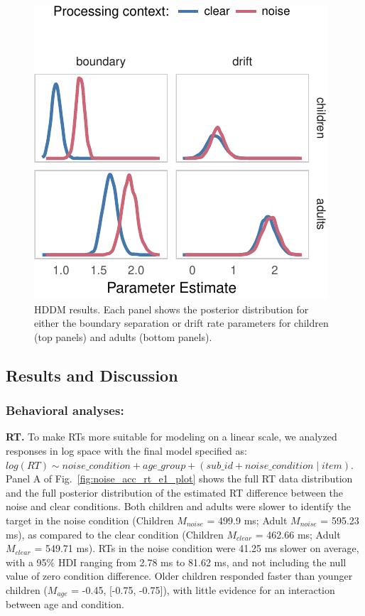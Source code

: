 \documentclass[10pt, letterpaper]{article}
\newenvironment{CodeChunk}{}{}
\begin{document}
\begin{CodeChunk}
\begin{figure}[t]

{\centering \includegraphics[width=0.75\linewidth]{figs/hddm_plot_noise-1} 

}

\caption[HDDM results]{HDDM results. Each panel shows the posterior distribution for either the boundary separation or drift rate parameters for children (top panels) and adults (bottom panels).}\label{fig:hddm_plot_noise}
\end{figure}
\end{CodeChunk}

\subsection{Results and Discussion}\label{results-and-discussion}

\subsubsection{Behavioral analyses:}\label{behavioral-analyses}

\textbf{RT.} To make RTs more suitable for modeling on a linear scale,
we analyzed responses in log space with the final model specified as:
\texttt{$log(RT) \sim noise\_condition + age\_group + (sub\_id + noise\_condition \mid item)$}.
Panel A of Fig.~\ref{fig:noise_acc_rt_e1_plot} shows the full RT data
distribution and the full posterior distribution of the estimated RT
difference between the noise and clear conditions. Both children and
adults were slower to identify the target in the noise condition
(Children \(M_{noise}\) = 499.9 ms; Adult \(M_{noise}\) = 595.23 ms), as
compared to the clear condition (Children \(M_{clear}\) = 462.66 ms;
Adult \(M_{clear}\) = 549.71 ms). RTs in the noise condition were 41.25
ms slower on average, with a 95\% HDI ranging from 2.78 ms to 81.62 ms,
and not including the null value of zero condition difference. Older
children responded faster than younger children (\(M_{age}\) = -0.45,
{[}-0.75, -0.75{]}), with little evidence for an interaction between age
and condition.
\end{document}
